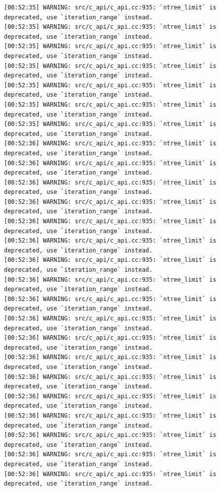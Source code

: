 \documentclass[
  letterpaper,
  DIV=11,
  numbers=noendperiod]{scrartcl}
\begin{document}
\begin{verbatim}
[00:52:35] WARNING: src/c_api/c_api.cc:935: `ntree_limit` is deprecated, use `iteration_range` instead.
[00:52:35] WARNING: src/c_api/c_api.cc:935: `ntree_limit` is deprecated, use `iteration_range` instead.
[00:52:35] WARNING: src/c_api/c_api.cc:935: `ntree_limit` is deprecated, use `iteration_range` instead.
[00:52:35] WARNING: src/c_api/c_api.cc:935: `ntree_limit` is deprecated, use `iteration_range` instead.
[00:52:35] WARNING: src/c_api/c_api.cc:935: `ntree_limit` is deprecated, use `iteration_range` instead.
[00:52:35] WARNING: src/c_api/c_api.cc:935: `ntree_limit` is deprecated, use `iteration_range` instead.
[00:52:35] WARNING: src/c_api/c_api.cc:935: `ntree_limit` is deprecated, use `iteration_range` instead.
[00:52:36] WARNING: src/c_api/c_api.cc:935: `ntree_limit` is deprecated, use `iteration_range` instead.
[00:52:36] WARNING: src/c_api/c_api.cc:935: `ntree_limit` is deprecated, use `iteration_range` instead.
[00:52:36] WARNING: src/c_api/c_api.cc:935: `ntree_limit` is deprecated, use `iteration_range` instead.
[00:52:36] WARNING: src/c_api/c_api.cc:935: `ntree_limit` is deprecated, use `iteration_range` instead.
[00:52:36] WARNING: src/c_api/c_api.cc:935: `ntree_limit` is deprecated, use `iteration_range` instead.
[00:52:36] WARNING: src/c_api/c_api.cc:935: `ntree_limit` is deprecated, use `iteration_range` instead.
[00:52:36] WARNING: src/c_api/c_api.cc:935: `ntree_limit` is deprecated, use `iteration_range` instead.
[00:52:36] WARNING: src/c_api/c_api.cc:935: `ntree_limit` is deprecated, use `iteration_range` instead.
[00:52:36] WARNING: src/c_api/c_api.cc:935: `ntree_limit` is deprecated, use `iteration_range` instead.
[00:52:36] WARNING: src/c_api/c_api.cc:935: `ntree_limit` is deprecated, use `iteration_range` instead.
[00:52:36] WARNING: src/c_api/c_api.cc:935: `ntree_limit` is deprecated, use `iteration_range` instead.
[00:52:36] WARNING: src/c_api/c_api.cc:935: `ntree_limit` is deprecated, use `iteration_range` instead.
[00:52:36] WARNING: src/c_api/c_api.cc:935: `ntree_limit` is deprecated, use `iteration_range` instead.
[00:52:36] WARNING: src/c_api/c_api.cc:935: `ntree_limit` is deprecated, use `iteration_range` instead.
[00:52:36] WARNING: src/c_api/c_api.cc:935: `ntree_limit` is deprecated, use `iteration_range` instead.
[00:52:36] WARNING: src/c_api/c_api.cc:935: `ntree_limit` is deprecated, use `iteration_range` instead.
[00:52:36] WARNING: src/c_api/c_api.cc:935: `ntree_limit` is deprecated, use `iteration_range` instead.
[00:52:36] WARNING: src/c_api/c_api.cc:935: `ntree_limit` is deprecated, use `iteration_range` instead.

\end{verbatim}
\end{document}
